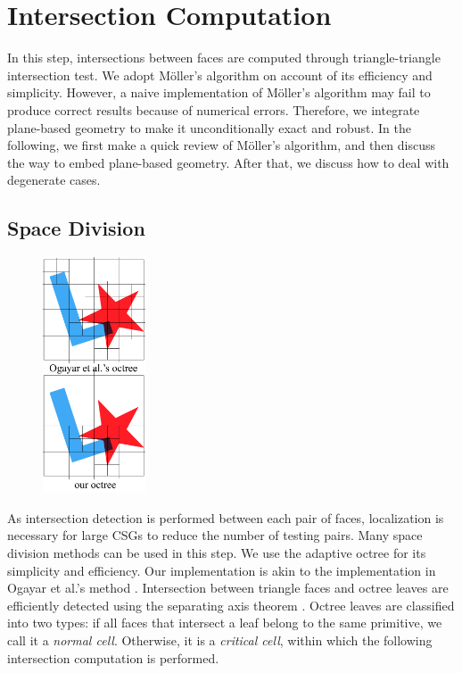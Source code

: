 \documentclass[10pt,journal,compsoc]{IEEEtran}
\begin{document}
\section{Intersection Computation}

\label{section:isect}
In this step, intersections between faces are computed through triangle-triangle intersection test. We adopt M\"{o}ller's algorithm \cite{moller1997fast} on account of its efficiency and simplicity. However, a naive implementation of M\"{o}ller's algorithm may fail to produce correct results because of numerical errors. Therefore, we integrate plane-based geometry to make it unconditionally exact and robust. In the following, we first make a quick review of M\"{o}ller's algorithm, and then discuss the way to embed plane-based geometry. After that, we discuss how to deal with degenerate cases.


\subsection{Space Division}

\begin{figure}
\includegraphics[width=1.2in]{octreediff}
\end{figure}
As intersection detection is performed between each pair of faces, localization is necessary for large CSGs to reduce the number of testing pairs. Many space division methods can be used in this step. We use the adaptive octree for its simplicity and efficiency. Our implementation is akin to the implementation in Ogayar et al.'s method \cite{ogayar2015deferred}. Intersection between triangle faces and octree leaves are efficiently detected using the separating axis theorem \cite{gottschalk1996obbtree}. Octree leaves are classified into two types: if all faces that intersect a leaf belong to the same primitive, we call it a \emph{normal cell}. Otherwise, it is a \emph{critical cell}, within which the following intersection computation is performed.
\end{document}
